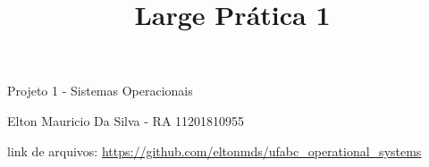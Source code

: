 




\frenchspacing 

\textual

	

	\title{Large Prática 1}	
		Projeto 1 - Sistemas Operacionais	
		
		Elton Mauricio Da Silva - RA 11201810955

		link de arquivos: \url{https://github.com/eltonmds/ufabc_operational_systems}
	
	

	


\printindex


